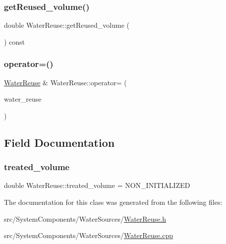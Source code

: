 \mbox{\label{classWaterReuse_a78c905f77ca46fbbb2251f9cfa9a04de_a78c905f77ca46fbbb2251f9cfa9a04de}} 
\subsubsection{\texorpdfstring{get\+Reused\+\_\+volume()}{getReused\_volume()}}
{\footnotesize\ttfamily double Water\+Reuse\+::get\+Reused\+\_\+volume (\begin{DoxyParamCaption}{ }\end{DoxyParamCaption}) const}

\mbox{\label{classWaterReuse_a8bf201adfc25021511d8844cd056d5bf_a8bf201adfc25021511d8844cd056d5bf}} 
\subsubsection{\texorpdfstring{operator=()}{operator=()}}
{\footnotesize\ttfamily \mbox{\hyperlink{classWaterReuse}{Water\+Reuse}} \& Water\+Reuse\+::operator= (\begin{DoxyParamCaption}\item[{const \mbox{\hyperlink{classWaterReuse}{Water\+Reuse}} \&}]{water\+\_\+reuse }\end{DoxyParamCaption})}



\subsection{Field Documentation}
\mbox{\label{classWaterReuse_a47ef62349f0092ccdda066905c89111a_a47ef62349f0092ccdda066905c89111a}} 
\subsubsection{\texorpdfstring{treated\+\_\+volume}{treated\_volume}}
{\footnotesize\ttfamily double Water\+Reuse\+::treated\+\_\+volume = N\+O\+N\+\_\+\+I\+N\+I\+T\+I\+A\+L\+I\+Z\+ED\hspace{0.3cm}{\ttfamily [private]}}



The documentation for this class was generated from the following files\+:\begin{DoxyCompactItemize}
\item 
src/\+System\+Components/\+Water\+Sources/\mbox{\hyperlink{WaterReuse_8h}{Water\+Reuse.\+h}}\item 
src/\+System\+Components/\+Water\+Sources/\mbox{\hyperlink{WaterReuse_8cpp}{Water\+Reuse.\+cpp}}\end{DoxyCompactItemize}
